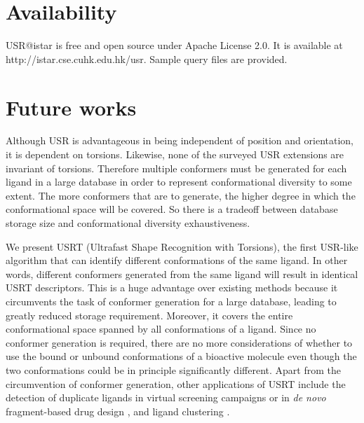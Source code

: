 \section{Availability}

USR@istar is free and open source under Apache License 2.0. It is available at http://istar.cse.cuhk.edu.hk/usr. Sample query files are provided.

\section{Future works}

Although USR is advantageous in being independent of position and orientation, it is dependent on torsions. Likewise, none of the surveyed USR extensions are invariant of torsions. Therefore multiple conformers must be generated for each ligand in a large database in order to represent conformational diversity to some extent. The more conformers that are to generate, the higher degree in which the conformational space will be covered. So there is a tradeoff between database storage size and conformational diversity exhaustiveness.

We present USRT (Ultrafast Shape Recognition with Torsions), the first USR-like algorithm that can identify different conformations of the same ligand. In other words, different conformers generated from the same ligand will result in identical USRT descriptors. This is a huge advantage over existing methods because it circumvents the task of conformer generation for a large database, leading to greatly reduced storage requirement. Moreover, it covers the entire conformational space spanned by all conformations of a ligand. Since no conformer generation is required, there are no more considerations of whether to use the bound or unbound conformations of a bioactive molecule even though the two conformations could be in principle significantly different. Apart from the circumvention of conformer generation, other applications of USRT include the detection of duplicate ligands in virtual screening campaigns \citep{1390} or in \textit{de novo} fragment-based drug design \citep{1409,1387}, and ligand clustering \citep{1280,1332}.

